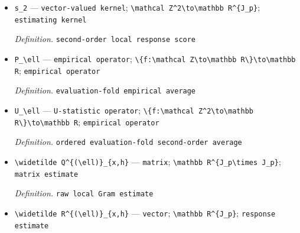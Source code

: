 \documentclass{article}
\begin{document}
\begin{itemize}
  \par\smallskip\noindent\emph{Definition.} \texttt{first-\allowbreak{}order local response score}
  \item \texttt{s\_\allowbreak{}2} --- \texttt{vector-\allowbreak{}valued kernel}; \texttt{\textbackslash{}\allowbreak{}mathcal Z\textasciicircum{}2\textbackslash{}\allowbreak{}to\textbackslash{}\allowbreak{}mathbb R\textasciicircum{}\{J\_\allowbreak{}p\}\allowbreak{}}; \texttt{estimating kernel}
  \par\smallskip\noindent\emph{Definition.} \texttt{second-\allowbreak{}order local response score}
  \item \texttt{P\_\allowbreak{}\textbackslash{}\allowbreak{}ell} --- \texttt{empirical operator}; \texttt{\textbackslash{}\allowbreak{}\{f:\allowbreak{}\textbackslash{}\allowbreak{}mathcal Z\textbackslash{}\allowbreak{}to\textbackslash{}\allowbreak{}mathbb R\textbackslash{}\allowbreak{}\}\allowbreak{}\textbackslash{}\allowbreak{}to\textbackslash{}\allowbreak{}mathbb R}; \texttt{empirical operator}
  \par\smallskip\noindent\emph{Definition.} \texttt{evaluation-\allowbreak{}fold empirical average}
  \item \texttt{U\_\allowbreak{}\textbackslash{}\allowbreak{}ell} --- \texttt{U-\allowbreak{}statistic operator}; \texttt{\textbackslash{}\allowbreak{}\{f:\allowbreak{}\textbackslash{}\allowbreak{}mathcal Z\textasciicircum{}2\textbackslash{}\allowbreak{}to\textbackslash{}\allowbreak{}mathbb R\textbackslash{}\allowbreak{}\}\allowbreak{}\textbackslash{}\allowbreak{}to\textbackslash{}\allowbreak{}mathbb R}; \texttt{empirical operator}
  \par\smallskip\noindent\emph{Definition.} \texttt{ordered evaluation-\allowbreak{}fold second-\allowbreak{}order average}
  \item \texttt{\textbackslash{}\allowbreak{}widetilde Q\textasciicircum{}\{(\textbackslash{}\allowbreak{}ell)\}\allowbreak{}\_\allowbreak{}\{x,\allowbreak{}h\}\allowbreak{}} --- \texttt{matrix}; \texttt{\textbackslash{}\allowbreak{}mathbb R\textasciicircum{}\{J\_\allowbreak{}p\textbackslash{}\allowbreak{}times J\_\allowbreak{}p\}\allowbreak{}}; \texttt{matrix estimate}
  \par\smallskip\noindent\emph{Definition.} \texttt{raw local Gram estimate}
  \item \texttt{\textbackslash{}\allowbreak{}widetilde R\textasciicircum{}\{(\textbackslash{}\allowbreak{}ell)\}\allowbreak{}\_\allowbreak{}\{x,\allowbreak{}h\}\allowbreak{}} --- \texttt{vector}; \texttt{\textbackslash{}\allowbreak{}mathbb R\textasciicircum{}\{J\_\allowbreak{}p\}\allowbreak{}}; \texttt{response estimate}

\end{itemize}
\end{document}
